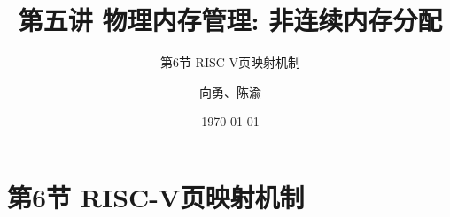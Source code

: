 


\title[第5讲]{第五讲 物理内存管理: 非连续内存分配} %
\subtitle{第6节 RISC-V页映射机制}
\author{向勇、陈渝} %
\date{\today} %



\begin{frame}
\titlepage %
\end{frame}


\section{第6节 RISC-V页映射机制}%


